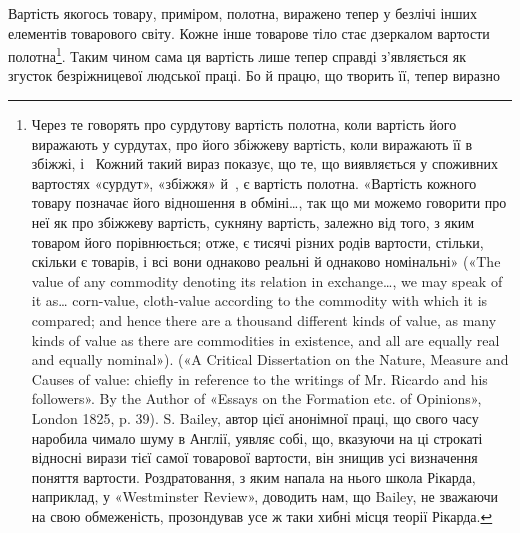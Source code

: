 Вартість якогось товару, приміром, полотна, виражено тепер
у безлічі інших елементів товарового світу. Кожне інше товарове
тіло стає дзеркалом вартости полотна\footnote{
Через те говорять про сурдутову вартість полотна, коли вартість
його виражають у сурдутах, про його збіжжеву вартість, коли виражають
її в збіжжі, і~ Кожний такий вираз показує, що те, що виявляється
у споживних вартостях «сурдут», «збіжжя» й~, є вартість полотна.
«Вартість кожного товару позначає його відношення в обміні\dots{},
так що ми можемо говорити про неї як про збіжжеву вартість, сукняну
вартість, залежно від того, з яким товаром його порівнюється; отже, є
тисячі різних родів вартости, стільки, скільки є товарів, і всі вони однаково
реальні й однаково номінальні» («The value of any commodity denoting
its relation in exchange\dots{}, we may speak of it as\dots{} corn-value,
cloth-value according to the commodity with which it is compared; and
hence there are a thousand different kinds of value, as many kinds
of value as there are commodities in existence, and all are equally real
and equally nominal»). («A Critical Dissertation on the Nature, Measure
and Causes of value: chiefly in reference to the writings of Mr. Ricardo
and his followers». By the Author of «Essays on the Formation etc. of Opinions»,
London 1825, p. 39). S. Bailey, автор цієї анонімної праці, що
свого часу наробила чимало шуму в Англії, уявляє собі, що, вказуючи
на ці строкаті відносні вирази тієї самої товарової вартости, він знищив
усі визначення поняття вартости. Роздратовання, з яким напала на нього
школа Рікарда, наприклад, у «Westminster Review», доводить нам, що
Bailey, не зважаючи на свою обмеженість, прозондував усе ж таки
хибні місця теорії Рікарда.
}. Таким чином сама ця
вартість лише тепер справді з’являється як згусток безріжницевої
людської праці. Бо й працю, що творить її, тепер виразно
\parbreak{}  %
